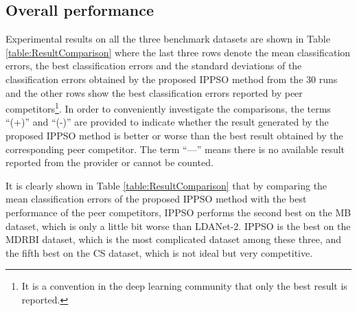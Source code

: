 \documentclass[conference]{IEEEtran}
\begin{document}
\subsection{Overall performance}\label{sec:Performance}

Experimental results on all the three benchmark datasets are shown in Table \ref{table:ResultComparison} where the last three rows denote the mean classification errors, the best classification errors and the standard deviations of the classification errors obtained by the proposed IPPSO method from the 30 runs and the other rows show the best classification errors reported by peer competitors\footnote{It is a convention in the deep learning community that only the best result is reported.}. In order to conveniently investigate the comparisons, the terms “(+)” and “(-)” are provided to indicate whether the result generated by the proposed IPPSO method is better or worse than the best result obtained by the corresponding peer competitor. The term “—” means there is no available result reported from the provider or cannot be counted.


It is clearly shown in Table \ref{table:ResultComparison} that by comparing the mean classification errors of the proposed IPPSO method with the best performance of the peer competitors, IPPSO performs the second best on the MB dataset, which is only a little bit worse than LDANet-2. IPPSO is the best on the MDRBI dataset, which is the most complicated dataset among these three, and the fifth best on the CS dataset, which is not ideal but very competitive. 
\end{document}
